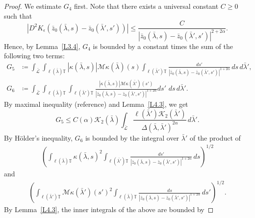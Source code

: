 \documentclass[reqno,centertags,12pt]{amsart}
\theoremstyle{definition}
\numberwithin{equation}{section}
\newcommand{\abs}[1]{\left\lvert#1\right\rvert}
\newcommand{\bbT}{{\mathbb{T}}}
\begin{document}
\begin{proof}
    We estimate $G_{4}$ first. Note that there exists a universal constant $C\geq 0$ such that
    \[
        \abs{D^{2}K_{\epsilon}(\bar{z}_{0}(\bar{\lambda},s) - \bar{z}_{0}(\bar{\lambda}',s'))}
        \leq \frac{C}
        {\abs{\bar{z}_{0}(\bar{\lambda},s) - \bar{z}_{0}(\bar{\lambda}',s')}^{2+2\alpha}}.
    \]
    Hence, by Lemma~\ref{L3.4}, $G_{4}$ is bounded by a constant times the sum of the
    following two terms:
    \begin{align*}
        G_{5} &\coloneqq
        \int_{\bar{\mathcal{L}}}\int_{\ell(\bar{\lambda})\bbT}
        \abs{\kappa(\bar{\lambda},s)}\mathcal{M}\kappa(\bar{\lambda})(s)
        \int_{\ell(\bar{\lambda}')\bbT}
        \frac{ds'}
        {\abs{\bar{z}_{0}(\bar{\lambda},s) - \bar{z}_{0}(\bar{\lambda}',s')}^{1+2\alpha}}
        \,ds\,d\bar{\lambda}',\\
        G_{6} &\coloneqq
        \int_{\bar{\mathcal{L}}}\int_{\ell(\bar{\lambda})\bbT}\int_{\ell(\bar{\lambda}')\bbT}
        \frac{\abs{\kappa(\bar{\lambda},s)}\mathcal{M}\kappa(\bar{\lambda'})(s')}
        {\abs{\bar{z}_{0}(\bar{\lambda},s) - \bar{z}_{0}(\bar{\lambda}',s')}^{1+2\alpha}}
        ds'\,\,ds\,d\bar{\lambda}'.
    \end{align*}
    By maximal inequality (reference) and Lemma~\ref{L4.3}, we get
    \[
        G_{5} \leq C(\alpha)\mathcal{K}_{2}(\bar{\lambda})
        \int_{\bar{\mathcal{L}}}
        \frac{\ell(\bar{\lambda}')\mathcal{K}_{2}(\bar{\lambda}')}
        {\Delta(\bar{\lambda},\bar{\lambda}')^{2\alpha}}
        \,d\bar{\lambda}'.
    \]
    By H\"{o}lder's inequality, $G_{6}$ is bounded by
    the integral over $\bar{\lambda}'$ of the product of
    \begin{align*}
        \left(
            \int_{\ell(\bar{\lambda})\bbT}
            \kappa(\bar{\lambda},s)^{2}
            \int_{\ell(\bar{\lambda'})\bbT}
            \frac{ds'}
            {\abs{\bar{z}_{0}(\bar{\lambda},s) - \bar{z}_{0}(\bar{\lambda}',s')}^{1+2\alpha}}
            \,ds
        \right)^{1/2}
    \end{align*}
    and
    \begin{align*}
        \left(
            \int_{\ell(\bar{\lambda}')\bbT}
            \mathcal{M}\kappa(\bar{\lambda}')(s')^{2}
            \int_{\ell(\bar{\lambda})\bbT}
            \frac{ds}
            {\abs{\bar{z}_{0}(\bar{\lambda},s) - \bar{z}_{0}(\bar{\lambda}',s')}^{1+2\alpha}}
            \,ds'
        \right)^{1/2}.
    \end{align*}
    By Lemma~\ref{L4.3}, the inner integrals
    of the above are bounded by

\end{proof}
\end{document}
